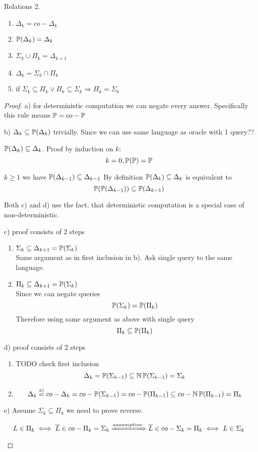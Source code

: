 \begin{theorem} Relations 2.
	\begin{enumerate}[label=\alph*)]
		\item $\Delta_k = co-\Delta_k$
		\item $\operatorname{\mathbb{P}}(\Delta_k) = \Delta_k$
		\item $\Sigma_k \cup \Pi_k = \Delta_{k + 1}$
		\item $\Delta_k = \Sigma_k \cap \Pi_k$
		\item if $\Sigma_k \subseteq \Pi_k \lor \Pi_k \subseteq \Sigma_k \Rightarrow \Pi_k = \Sigma_k$
	\end{enumerate}
\end{theorem}
\begin{proof}
	a) for deterministic computation we can negate every answer.
	Specifically this rule means $\operatorname{\mathbb{P}} = co-\operatorname{\mathbb{P}}$

	b) $\Delta_k \subseteq \operatorname{\mathbb{P}}(\Delta_k)$ trivially. Since we can use same language as oracle with 1 query??

	$\operatorname{\mathbb{P}}(\Delta_k) \subseteq \Delta_k$. Proof by induction on $k$:
	\[ k = 0, \operatorname{\mathbb{P}}(\operatorname{\mathbb{P}}) = \operatorname{\mathbb{P}} \]

	$k \geq 1$ we have $\operatorname{\mathbb{P}}(\Delta_{k - 1}) \subseteq \Delta_{k - 1}$
	By definition $\operatorname{\mathbb{P}}(\Delta_k) \subseteq \Delta_k$ is equivalent to
	\[ \operatorname{\mathbb{P}}(\operatorname{\mathbb{P}}(\Delta_{k - 1})) \subseteq \operatorname{\mathbb{P}}(\Delta_{k - 1}) \]

	Both c) and d) use the fact, that deterministic computation is a special case of non-deterministic.

	c) proof consists of 2 steps
	\begin{enumerate}
		\item $\Sigma_k \subseteq \Delta_{k + 1} = \operatorname{\mathbb{P}}(\Sigma_k)$\\
			Same argument as in first inclusion in b).
			Ask single query to the same language.
		\item $\Pi_k \subseteq \Delta_{k + 1} = \operatorname{\mathbb{P}}(\Sigma_k)$\\
			Since we can negate queries
			\[ \operatorname{\mathbb{P}}(\Sigma_k) = \operatorname{\mathbb{P}}(\Pi_k) \]
			Therefore using same argument as above with single query
			\[ \Pi_k \subseteq \operatorname{\mathbb{P}}(\Pi_k) \]
	\end{enumerate}

	d) proof consists of 2 steps
	\begin{enumerate}
		\item TODO check first inclusion
			\[ \Delta_k = \operatorname{\mathbb{P}}(\Sigma_{k - 1}) \subseteq \operatorname{\operatorname{\mathbb{N}}\mathbb{P}}(\Sigma_{k - 1}) = \Sigma_k \]
		\item
			\[ \Delta_k \stackrel{\text{a)}}{=} co-\Delta_k = co-\operatorname{\mathbb{P}}(\Sigma_{k - 1}) = co-\operatorname{\mathbb{P}}(\Pi_{k - 1}) \subseteq co-\operatorname{\operatorname{\mathbb{N}}\mathbb{P}}(\Pi_{k - 1}) = \Pi_k \]
	\end{enumerate}

	e) Assume $\Sigma_k \subseteq \Pi_k$ we need to prove reverse.

	\[ L \in \Pi_k \iff \overline{L} \in co-\Pi_k = \Sigma_k \xRightarrow{assumption} \overline{L} \in co-\Sigma_k = \Pi_k \iff L \in \Sigma_k  \]
\end{proof}


